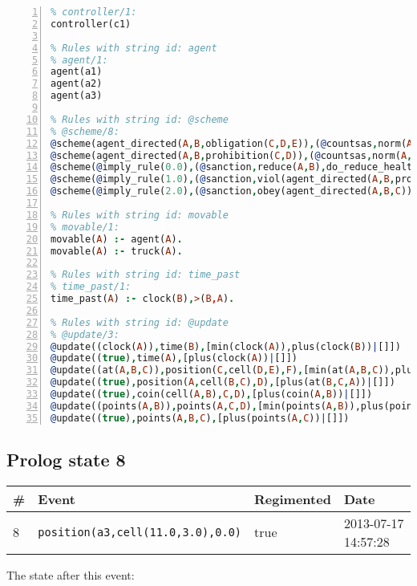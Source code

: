 \documentclass[11pt]{article}\usepackage[utf8]{inputenc}\usepackage{geometry}
\begin{document}
\begin{lstlisting}[language=Prolog, numbers=left]
% Rules with string id: controller
% controller/1:
controller(c1)

% Rules with string id: agent
% agent/1:
agent(a1)
agent(a2)
agent(a3)

% Rules with string id: @scheme
% @scheme/8:
@scheme(agent_directed(A,B,obligation(C,D,E)),(@countsas,norm(A,B,F,obligation(C,D,E)),F),false,(listTrue(C)),(time_past(D)),false,[plus(viol(agent_directed(A,B,obligation(C,D,E))))|[]],[plus(obey(agent_directed(A,B,obligation(C,D,E))))|[]])
@scheme(agent_directed(A,B,prohibition(C,D)),(@countsas,norm(A,B,E,prohibition(C,D)),E),(listTrue(C)),false,(false),false,[plus(viol(agent_directed(A,B,prohibition(C,D))))|[]],[plus(obey(agent_directed(A,B,prohibition(C,D))))|[]])
@scheme(@imply_rule(0.0),(@sanction,reduce(A,B),do_reduce_health(A,B),notifyAgent(A,changed(status))),true,false,false,false,[min(reduce(A,B))|[]],[])
@scheme(@imply_rule(1.0),(@sanction,viol(agent_directed(A,B,prohibition(C,D))),do_sanction(D)),true,false,false,false,[min(viol(agent_directed(A,B,prohibition(C,D))))|[]],[])
@scheme(@imply_rule(2.0),(@sanction,obey(agent_directed(A,B,C))),true,false,false,false,[min(obey(agent_directed(A,B,C)))|[]],[])

% Rules with string id: movable
% movable/1:
movable(A) :- agent(A).
movable(A) :- truck(A).

% Rules with string id: time_past
% time_past/1:
time_past(A) :- clock(B),>(B,A).

% Rules with string id: @update
% @update/3:
@update((clock(A)),time(B),[min(clock(A)),plus(clock(B))|[]])
@update((true),time(A),[plus(clock(A))|[]])
@update((at(A,B,C)),position(C,cell(D,E),F),[min(at(A,B,C)),plus(at(D,E,C))|[]])
@update((true),position(A,cell(B,C),D),[plus(at(B,C,A))|[]])
@update((true),coin(cell(A,B),C,D),[plus(coin(A,B))|[]])
@update((points(A,B)),points(A,C,D),[min(points(A,B)),plus(points(A,D))|[]])
@update((true),points(A,B,C),[plus(points(A,C))|[]])

\end{lstlisting}
\clearpage 
\subsection{Prolog state 8}
\begin{table}[ht]
\centering 
\begin{tabular}{l l l l} 
\textbf{\#} & \textbf{Event} & \textbf{Regimented} & \textbf{Date} \\ [0.5ex] 
\hline
8&\texttt{position(a3,cell(11.0,3.0),0.0)}&true&2013-07-17 14:57:28\\ [1ex] \hline\end{tabular}
\end{table}
The state after this event:
\end{document}
